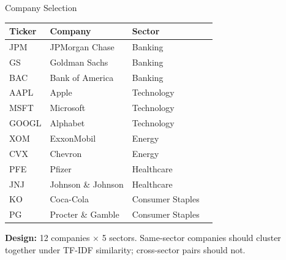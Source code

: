 \documentclass[aspectratio=169,11pt]{beamer}
\begin{document}
\begin{frame}{Company Selection}

\small
\begin{table}
\centering
\begin{tabular}{llll}
\toprule
\textbf{Ticker} & \textbf{Company} & \textbf{Sector} \\
\midrule
JPM   & JPMorgan Chase      & Banking           \\
GS    & Goldman Sachs        & Banking           \\
BAC   & Bank of America      & Banking           \\
AAPL  & Apple                & Technology        \\
MSFT  & Microsoft            & Technology        \\
GOOGL & Alphabet             & Technology        \\
XOM   & ExxonMobil           & Energy            \\
CVX   & Chevron              & Energy            \\
PFE   & Pfizer               & Healthcare        \\
JNJ   & Johnson \& Johnson   & Healthcare        \\
KO    & Coca-Cola            & Consumer Staples  \\
PG    & Procter \& Gamble    & Consumer Staples  \\
\bottomrule
\end{tabular}
\end{table}

\vspace{4pt}
\textbf{Design:} 12 companies $\times$ 5 sectors. Same-sector
companies should cluster together under TF-IDF similarity;
cross-sector pairs should not.

\end{frame}
\end{document}
